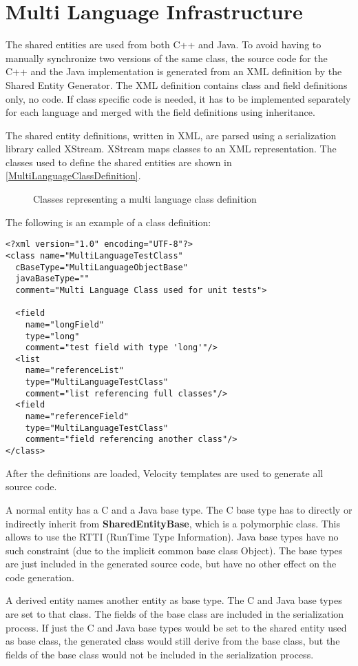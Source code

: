\documentclass[a4paper,12pt]{report}
\newlength{\imgwidth}
\newcommand{\umlDiagram}[1]{%
	\settowidth{\imgwidth}{\texttt{[image: out/diagrams/\#1.pdf]}}%
	\setlength{\imgwidth}{\minof{0.5\imgwidth}{\textwidth}}%
	\par\vskip0.5cm\noindent\makebox[\textwidth][c]{%
	\texttt{[image: out/diagrams/\#1.pdf]}%
}\vskip0.5cm}
\newcommand{\umlFloat}[2]{
\begin{figure}[htbp]
\umlDiagram{#1}
\caption{#2}
\label{#1}
\end{figure}
}
\newcommand{\umlRef}[1]{\autoref{#1}}
\newcommand{\class}[1]{\textbf{#1}}
\begin{document}
\section{Multi Language Infrastructure}
\label{sec:MultiLanguageInfrastructure}
The shared entities are used from both C++ and Java. To avoid having to
manually synchronize two versions of the same class, the source code for the C++
and the Java implementation is generated from an XML definition by the Shared
Entity Generator. The XML definition contains class and field definitions only,
no code. If class specific code is needed, it has to be implemented separately for each language and merged with the field definitions using
inheritance.

The shared entity definitions, written in XML, are parsed using a
serialization library called XStream. XStream maps classes to an XML
representation. The classes used to define the shared entities are shown
in \umlRef{MultiLanguageClassDefinition}.

\umlFloat{MultiLanguageClassDefinition}{Classes representing a multi language
class definition}

The following is an example of a class definition:
\begin{verbatim}
<?xml version="1.0" encoding="UTF-8"?>
<class name="MultiLanguageTestClass" 
  cBaseType="MultiLanguageObjectBase"
  javaBaseType=""
  comment="Multi Language Class used for unit tests">

  <field 
    name="longField" 
    type="long" 
    comment="test field with type 'long'"/>
  <list  
    name="referenceList" 
    type="MultiLanguageTestClass" 
    comment="list referencing full classes"/>
  <field 
    name="referenceField" 
    type="MultiLanguageTestClass" 
    comment="field referencing another class"/>
</class>
\end{verbatim}

After the definitions are loaded, Velocity templates are used to generate all
source code.

A normal entity has a C and a Java base type. The C base type has to directly or
indirectly inherit from \class{SharedEntityBase}, which is a polymorphic class.
This allows to use the RTTI (RunTime Type Information). Java base types have no
such constraint (due to the implicit common base class Object). The base types
are just included in the generated source code, but have no other effect on the
code generation.

A derived entity names another entity as base type. The C and
Java base types are set to that class. The fields of the base class are included in
the serialization process. If just the C and Java base types would be set to the
shared entity used as base class, the generated class would still derive
from the base class, but the fields of the base class would not be included in
the serialization process.
\end{document}
